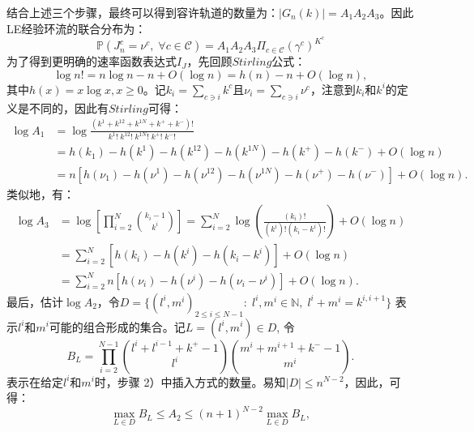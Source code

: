 结合上述三个步骤，最终可以得到容许轨道的数量为：$|G_n(k)|=A_1A_2A_3$。因此LE经验环流的联合分布为：
\begin{equation} \label{trajectories}
    \mathbb{P}\left(J^c_n=\nu^c,\;\forall c\in\mathcal{C}\right)
    = A_1 A_2 A_3 \Pi_{c\in\mathcal{C}} (\gamma^c)^{K^c}
\end{equation}
为了得到更明确的速率函数表达式$I_J$，先回顾$Stirling$公式：
\begin{equation*}
    \log n! = n\log n-n+O(\log n)=h(n)-n+O(\log n),
\end{equation*}
其中$h(x)=x \log x, x \geqslant 0$。记$k_i=\sum_{c\ni i}k^c$且$\nu_i=\sum_{c\ni i}\nu^c$，注意到$k_i$和$k^i$的定义是不同的，因此有$Stirling$可得：
\begin{equation}\label{log A1}
    \begin{split}
    \log A_1&=\log\frac{(k^1+k^{12}+k^{1N}+k^{+}+k^{-})!}{k^1!\;k^{12}!\;k^{1N}!\;k^{+}!\;k^{-}!}\\
    &= h(k_1)-h(k^1)-h(k^{12})-h(k^{1N})-h(k^+)-h(k^-)+O(\log n)\\
    &= n\left[h(\nu_1)-h(\nu^1)-h(\nu^{12})-h(\nu^{1N})-h(\nu^+)-h(\nu^-)\right]+O(\log n).
    \end{split}
\end{equation}
类似地，有：
\begin{equation}\label{log A3}
    \begin{split}
    \log A_3&=\log\left[\prod_{i=2}^N\binom{k_i-1}{k^{i}}\right]
    =\sum_{i=2}^N\log\left(\frac{\left(k_i\right)!}{\left(k^i\right)!\left(k_i-k^i\right)!}\right)+O(\log n)\\
    &=\sum_{i=2}^N\left[h(k_i)-h(k^i)-h(k_i-k^i)\right]+O(\log n)\\
    &=\sum_{i=2}^Nn\left[h(\nu_i )-h(\nu^i)-h(\nu_i-\nu^i)\right]+O(\log n).
    \end{split}
\end{equation}
最后，估计$\log A_2$，令$D = \{(l^i,m^i)_{2\le i\le N-1}:\;l^i,m^i\in\mathbb{N},\;l^i+m^i=k^{i,i+1}\}$ 表示$l^i$和$m^i$可能的组合形成的集合。记$L = (l^i,m^i)\in D$, 令
\begin{equation*}
    B_L=\prod_{i=2}^{N-1}\binom{l^{i}+l^{i-1}+k^{+}-1}{l^{i}}\binom{m^{i}+m^{i+1}+k^{-}-1}{m^{i}}.
\end{equation*}
表示在给定$l^i$和$m^i$时，步骤 2）中插入方式的数量。易知$|D| \leqslant n^{N-2}$，因此，可得：
\begin{equation}\label{inequality}
    \max_{L\in D}B_L \le A_2 \le (n+1)^{N-2} \max_{L\in D}B_L,
\end{equation}
